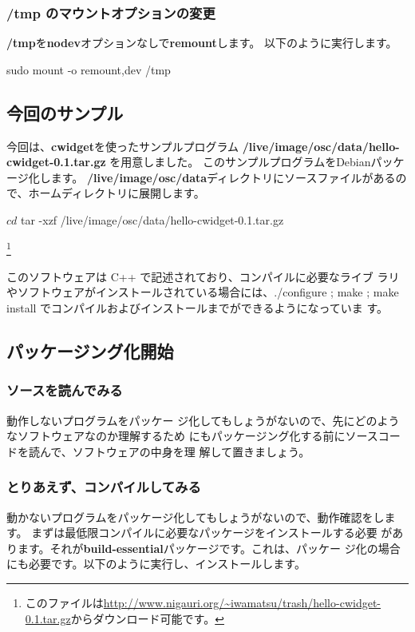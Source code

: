 \documentclass[mingoth,a4paper]{jsarticle}
\begin{document}
\subsubsection{/tmp のマウントオプションの変更}
{\bf /tmp}を{\bf nodev}オプションなしで{\bf remount}します。
以下のように実行します。
\begin{commandline}
sudo mount -o remount,dev /tmp
\end{commandline}

\subsection{今回のサンプル}
今回は、{\bf cwidget}を使ったサンプルプログラム
{\bf /live/image/osc/data/hello-cwidget-0.1.tar.gz}
を用意しました。
このサンプルプログラムをDebianパッケージ化します。
{\bf /live/image/osc/data}ディレクトリにソースファイルがあるので、ホームディレクトリに展開します。
\begin{commandline}
$ cd
$ tar -xzf /live/image/osc/data/hello-cwidget-0.1.tar.gz
\end{commandline}
\footnote{このファイルは\url{http://www.nigauri.org/~iwamatsu/trash/hello-cwidget-0.1.tar.gz}からダウンロード可能です。}

このソフトウェアは C++ で記述されており、コンパイルに必要なライブ
ラリやソフトウェアがインストールされている場合には、./configure ; make ;
make install でコンパイルおよびインストールまでができるようになっていま
す。

\subsection{パッケージング化開始}
\subsubsection{ソースを読んでみる}
動作しないプログラムをパッケー
ジ化してもしょうがないので、先にどのようなソフトウェアなのか理解するため
にもパッケージング化する前にソースコードを読んで、ソフトウェアの中身を理
解して置きましょう。

\subsubsection{とりあえず、コンパイルしてみる}
動かないプログラムをパッケージ化してもしょうがないので、動作確認をします。
まずは最低限コンパイルに必要なパッケージをインストールする必要
があります。それが{\bf build-essential}パッケージです。これは、パッケー
ジ化の場合にも必要です。以下のように実行し、インストールします。
\end{document}
